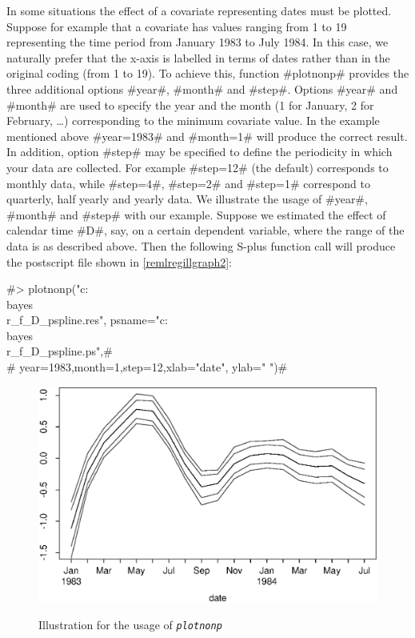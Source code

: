 In some situations the effect of a covariate representing dates
must be plotted. Suppose for example that a covariate has values
ranging from 1 to 19 representing the time period from January
1983 to July 1984. In this case, we naturally prefer that the
x-axis is labelled in terms of dates rather than in the original
coding (from 1 to 19). To achieve this, function #plotnonp#
provides the three additional options #year#, #month# and #step#.
Options #year# and #month# are  used to specify the year and the
month (1 for January, 2 for February, \dots) corresponding to the
minimum covariate value. In the example mentioned above
#year=1983# and #month=1# will produce the correct result. In
addition, option #step# may be specified to define the periodicity
in which your data are collected. For example #step=12# (the
default) corresponds to monthly data, while #step=4#, #step=2# and
#step=1# correspond to quarterly, half yearly and yearly data. We
illustrate the usage of #year#, #month# and #step# with our
example. Suppose we estimated the effect of calendar time #D#,
say, on a certain dependent variable, where the range of the data
is as described above. Then the following S-plus function call
will produce the postscript file shown in
\autoref{remlregillgraph2}:

#> plotnonp("c:\\bayes\\r_f_D_pspline.res", psname="c:\\bayes\\r_f_D_pspline.ps",#\\
#  year=1983,month=1,step=12,xlab="date", ylab=" ")#

\begin{figure}[ht]
\begin{center}
\includegraphics[scale=0.8]{grafiken/plotnonpdate.eps}
{\em \caption{ \label{remlregillgraph2} Illustration for the usage
of \em\texttt{plotnonp}}}
\end{center}
\end{figure}


